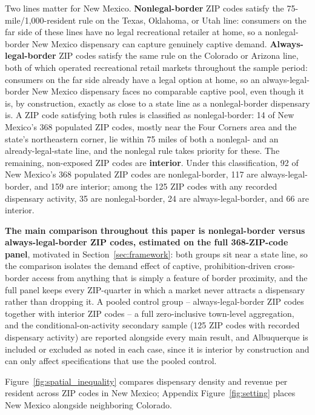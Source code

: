 \documentclass[english,12pt]{article}
\begin{document}
Two lines matter for New Mexico. \textbf{Nonlegal-border} ZIP codes satisfy the 75-mile/1,000-resident rule on the Texas, Oklahoma, or Utah line: consumers on the far side of these lines have no legal recreational retailer at home, so a nonlegal-border New Mexico dispensary can capture genuinely captive demand. \textbf{Always-legal-border} ZIP codes satisfy the same rule on the Colorado or Arizona line, both of which operated recreational retail markets throughout the sample period: consumers on the far side already have a legal option at home, so an always-legal-border New Mexico dispensary faces no comparable captive pool, even though it is, by construction, exactly as close to a state line as a nonlegal-border dispensary is. A ZIP code satisfying both rules is classified as nonlegal-border: 14 of New Mexico's 368 populated ZIP codes, mostly near the Four Corners area and the state's northeastern corner, lie within 75 miles of both a nonlegal- and an already-legal-state line, and the nonlegal rule takes priority for these. The remaining, non-exposed ZIP codes are \textbf{interior}. Under this classification, 92 of New Mexico's 368 populated ZIP codes are nonlegal-border, 117 are always-legal-border, and 159 are interior; among the 125 ZIP codes with any recorded dispensary activity, 35 are nonlegal-border, 24 are always-legal-border, and 66 are interior.

\textbf{The main comparison throughout this paper is nonlegal-border versus always-legal-border ZIP codes, estimated on the full 368-ZIP-code panel}, motivated in Section~\ref{sec:framework}: both groups sit near a state line, so the comparison isolates the demand effect of captive, prohibition-driven cross-border access from anything that is simply a feature of border proximity, and the full panel keeps every ZIP-quarter in which a market never attracts a dispensary rather than dropping it. A pooled control group -- always-legal-border ZIP codes together with interior ZIP codes -- a full zero-inclusive town-level aggregation, and the conditional-on-activity secondary sample (125 ZIP codes with recorded dispensary activity) are reported alongside every main result, and Albuquerque is included or excluded as noted in each case, since it is interior by construction and can only affect specifications that use the pooled control.

Figure~\ref{fig:spatial_inequality} compares dispensary density and revenue per resident across ZIP codes in New Mexico; Appendix Figure~\ref{fig:setting} places New Mexico alongside neighboring Colorado.
\end{document}
